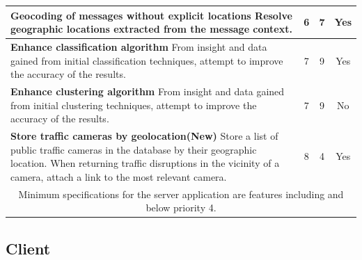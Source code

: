 \begin{center}
\begin{tabular}{ | p{8.5cm} | c | c | c | }
\textbf{Geocoding of messages without explicit locations} \newline
Resolve geographic locations extracted from the message context. & 6 & 7 & Yes \\ \hline

\textbf{Enhance classification algorithm} \newline
From insight and data gained from initial classification techniques, attempt to
improve the accuracy of the results. & 7 & 9 & Yes \\ \hline

\textbf{Enhance clustering algorithm} \newline
From insight and data gained from initial clustering techniques, attempt to
improve the accuracy of the results.& 7 & 9 & No \\ \hline

\textbf{Store traffic cameras by geolocation(New)}\newline
Store a list of public traffic cameras in the database by their geographic
location. When returning traffic disruptions in the vicinity of a camera,
attach a link to the most relevant camera. &  8 &  4 & Yes \\ \hline

\multicolumn{4}{|c|}{Minimum specifications for the server application are
features including and below priority 4.} \\ \hline
\end{tabular}
\end{center}

\subsection{Client}

